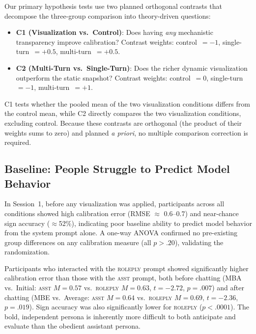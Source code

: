 Our primary hypothesis tests use two planned orthogonal contrasts that
decompose the three-group comparison into theory-driven questions:
\begin{itemize}
    \item \textbf{C1 (Visualization vs.\ Control)}: Does having
    \emph{any} mechanistic transparency improve calibration? Contrast
    weights: control~$= -1$, single-turn~$= +0.5$,
    multi-turn~$= +0.5$.
    \item \textbf{C2 (Multi-Turn vs.\ Single-Turn)}: Does the richer
    dynamic visualization outperform the static snapshot? Contrast
    weights: control~$= 0$, single-turn~$= -1$, multi-turn~$= +1$.
\end{itemize}
C1 tests whether the pooled mean of the two visualization conditions
differs from the control mean, while C2 directly compares the two
visualization conditions, excluding control. Because these contrasts
are orthogonal (the product of their weights sums to zero) and planned
\emph{a priori}, no multiple comparison correction is required.

\subsection{Baseline: People Struggle to Predict Model Behavior}

In Session~1, before any visualization was applied, participants across
all conditions showed high calibration error (RMSE $\approx$ 0.6--0.7)
and near-chance sign accuracy ($\approx$52\%), indicating poor baseline
ability to predict model behavior from the system prompt alone. A
one-way ANOVA confirmed no pre-existing group differences on any
calibration measure (all $p > .20$), validating the randomization.

Participants who interacted with the \textsc{roleply} prompt showed
significantly higher calibration error than those with the \textsc{asst}
prompt, both before chatting (MBA vs.\ Initial: \textsc{asst}
$M = 0.57$ vs.\ \textsc{roleply} $M = 0.63$, $t = -2.72$, $p = .007$)
and after chatting (MBE vs.\ Average: \textsc{asst} $M = 0.64$ vs.\
\textsc{roleply} $M = 0.69$, $t = -2.36$, $p = .019$). Sign accuracy
was also significantly lower for \textsc{roleply} ($p < .0001$).
The bold, independent persona is inherently more difficult to both
anticipate and evaluate than the obedient assistant persona.

